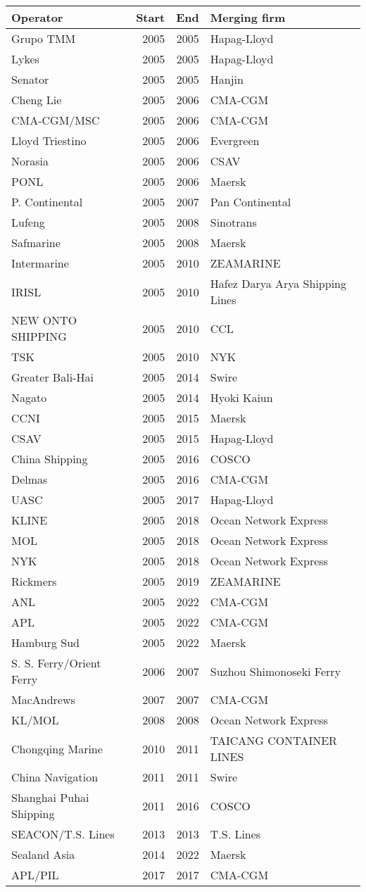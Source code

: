 
\begin{tabular}[t]{lrrl}
\toprule
Operator & Start & End & Merging firm\\
\midrule
Grupo TMM & 2005 & 2005 & Hapag-Lloyd\\
Lykes & 2005 & 2005 & Hapag-Lloyd\\
Senator & 2005 & 2005 & Hanjin\\
Cheng Lie & 2005 & 2006 & CMA-CGM\\
CMA-CGM/MSC & 2005 & 2006 & CMA-CGM\\
Lloyd Triestino & 2005 & 2006 & Evergreen\\
Norasia & 2005 & 2006 & CSAV\\
PONL & 2005 & 2006 & Maersk\\
P. Continental & 2005 & 2007 & Pan Continental\\
Lufeng & 2005 & 2008 & Sinotrans\\
Safmarine & 2005 & 2008 & Maersk\\
Intermarine & 2005 & 2010 & ZEAMARINE\\
IRISL & 2005 & 2010 & Hafez Darya Arya Shipping Lines\\
NEW ONTO SHIPPING & 2005 & 2010 & CCL\\
TSK & 2005 & 2010 & NYK\\
Greater Bali-Hai & 2005 & 2014 & Swire\\
Nagato & 2005 & 2014 & Hyoki Kaiun\\
CCNI & 2005 & 2015 & Maersk\\
CSAV & 2005 & 2015 & Hapag-Lloyd\\
China Shipping & 2005 & 2016 & COSCO\\
Delmas & 2005 & 2016 & CMA-CGM\\
UASC & 2005 & 2017 & Hapag-Lloyd\\
KLINE & 2005 & 2018 & Ocean Network Express\\
MOL & 2005 & 2018 & Ocean Network Express\\
NYK & 2005 & 2018 & Ocean Network Express\\
Rickmers & 2005 & 2019 & ZEAMARINE\\
ANL & 2005 & 2022 & CMA-CGM\\
APL & 2005 & 2022 & CMA-CGM\\
Hamburg Sud & 2005 & 2022 & Maersk\\
S. S. Ferry/Orient Ferry & 2006 & 2007 & Suzhou Shimonoseki Ferry\\
MacAndrews & 2007 & 2007 & CMA-CGM\\
KL/MOL & 2008 & 2008 & Ocean Network Express\\
Chongqing Marine & 2010 & 2011 & TAICANG CONTAINER LINES\\
China Navigation & 2011 & 2011 & Swire\\
Shanghai Puhai Shipping & 2011 & 2016 & COSCO\\
SEACON/T.S. Lines & 2013 & 2013 & T.S. Lines\\
Sealand Asia & 2014 & 2022 & Maersk\\
APL/PIL & 2017 & 2017 & CMA-CGM\\
\bottomrule
\end{tabular}
